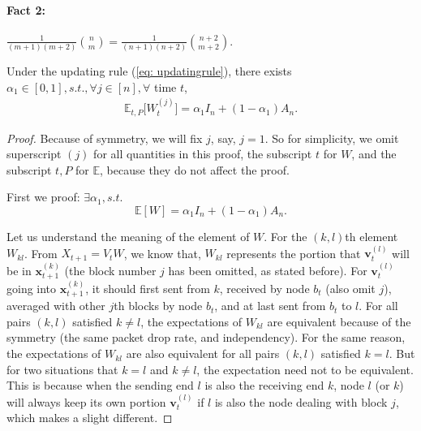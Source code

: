 \paragraph{Fact 2:} $\frac{1}{(m+1)(m+2)}\binom{n}{m} = \frac{1}{(n+1)(n+2)}\binom{n+2}{m+2}$.
\begin{lemma} \label{lem: EW}
	Under the updating rule (\ref{eq: updatingrule}), there exists $\alpha_1\in [0,1], s.t.,  \forall j\in [n], \forall$ time $t$,
	\begin{align*}
		\mathbb{E}_{t,P} \big[W_t^{(j)}\big] = \alpha_1 I_n + (1-\alpha_1)A_n.
	\end{align*}
\begin{proof}
	Because of symmetry, we will fix $j$, say, $j=1$. So for simplicity, we omit superscript ${(j)}$ for all quantities in this proof, the subscript $t$ for $W$, and the subscript $t,P$ for $\mathbb{E}$, because they do not affect the proof.
	
	First we proof: $\exists \alpha_1, s.t. $
	\begin{equation} \label{eq: EW}
		\mathbb{E} [W]= \alpha_1 I_n + (1-\alpha_1)A_n.
	\end{equation}
	
	Let us understand the meaning of the element of $W$. For the $(k,l)$th element $W_{kl}$. From $X_{t+1} = V_tW$, we know that, $W_{kl}$ represents the portion that $\bm{v}_t^{(l)}$ will be in $\bm{x}_{t+1}^{(k)}$ (the block number ${j}$ has been omitted, as stated before). For $\bm{v}_t^{(l)}$ going into $\bm{x}_{t+1}^{(k)}$, it should first sent from $k$, received by node $b_t$ (also omit ${j}$), averaged with other $j$th blocks by node $b_t$, and at last sent from $b_t$ to $l$. For all pairs $(k,l)$ satisfied $k\not= l$, the expectations of $W_{kl}$ are equivalent because of the symmetry (the same packet drop rate, and independency). For the same reason, the expectations of $W_{kl}$ are also equivalent for all pairs $(k,l)$ satisfied $k=l$. But for two situations that $k=l$ and $k\not=l$, the expectation need not to be equivalent. This is because when the sending end $l$ is also the receiving end $k$, node $l$ (or $k$) will always keep its own portion $\bm{v}_t^{(l)}$ if $l$ is also the node dealing with block $j$, which makes a slight different.
	

\end{proof}
\end{lemma}
